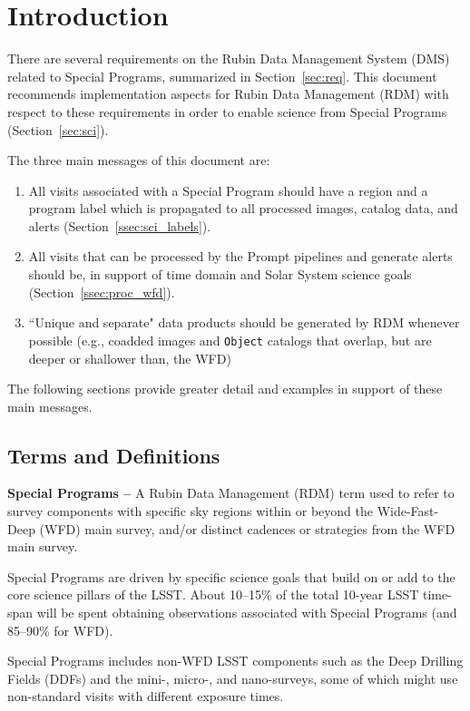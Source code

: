 \section{Introduction} \label{sec:intro}

There are several requirements on the Rubin Data Management System (DMS) 
related to Special Programs, summarized in Section~\ref{sec:req}.
This document recommends implementation aspects for Rubin Data Management (RDM)
with respect to these requirements in order to 
enable science from Special Programs (Section~\ref{sec:sci}).

The three main messages of this document are:
\begin{enumerate}
\item All visits associated with a Special Program should have a region and a program label 
which is propagated to all processed images, catalog data, and alerts (Section~\ref{ssec:sci_labels}).
\item All visits that can be processed by the Prompt pipelines and generate 
alerts should be, in support of time domain and Solar System science goals (Section~\ref{ssec:proc_wfd}).
\item ``Unique and separate" data products should be generated by RDM whenever possible 
(e.g., coadded images and {\tt Object} catalogs that overlap, but are deeper or shallower than, the WFD) 
\end{enumerate}

The following sections provide greater detail and examples in support of these main messages.


\subsection{Terms and Definitions}\label{ssec:intro_terms}

\textbf{Special Programs -- } 
A Rubin Data Management (RDM) term used to refer to survey 
components with specific sky regions within or beyond the 
Wide-Fast-Deep (WFD) main survey, and/or distinct cadences or 
strategies from the WFD main survey.

Special Programs are driven by specific science goals that build on or 
add to the core science pillars of the LSST.
About 10--15\% of the total 10-year LSST time-span will be spent obtaining 
observations associated with Special Programs (and 85--90\% for WFD).

Special Programs includes non-WFD LSST components such as the Deep Drilling 
Fields (DDFs) and the mini-, micro-, and nano-surveys, some of which 
might use non-standard visits with different exposure times.

